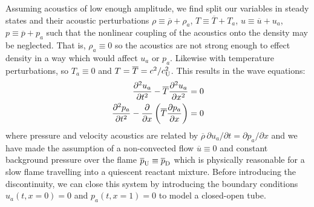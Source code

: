 Assuming acoustics of low enough amplitude, we find split our variables in steady states and their acoustic perturbations $ρ \equiv \overline{ρ} + ρ_a$, $T \equiv \overline{T} + T_a$, $u \equiv \overline{u} + u_a$, $p \equiv \overline{p} + p_a$ such that the nonlinear coupling of the acoustics onto the density may be neglected. That is, $ρ_a \equiv 0$ so the acoustics are not strong enough to effect density in a way which would affect $u_a$ or $p_a$. Likewise with temperature perturbations, so $T_a \equiv 0$ and $T = \oT = c^2 / c_{\rm{U}}^2$. This results in the wave equations:
\begin{subequations} \label{eqn:wave_eqn}
\begin{align} 
\pdv[2]{u_a}{t} - \oT \pdv[2]{u_a}{x} &= 0 \label{eqn:wave_eqn_u} \\
\pdv[2]{p_a}{t} - \pdv{x} \left( \oT \pdv{p_a}{x} \right) &= 0 \label{eqn:wave_eqn_p}
\end{align}
\end{subequations}
where pressure and velocity acoustics are related by $\overline{ρ} \, \partial u_a / \partial t = \partial p_a / \partial x$ and we have made the assumption of a non-convected flow $\overline{u} \equiv 0$ and constant background pressure over the flame $\overline{p}_{\rm{U}} \equiv \overline{p}_{\rm{D}}$ which is physically reasonable for a slow flame travelling into a quiescent reactant mixture. Before introducing the discontinuity, we can close this system by introducing the boundary conditions $u_a(t, x = 0) = 0$ and $p_a(t, x = 1) = 0$ to model a closed-open tube.

